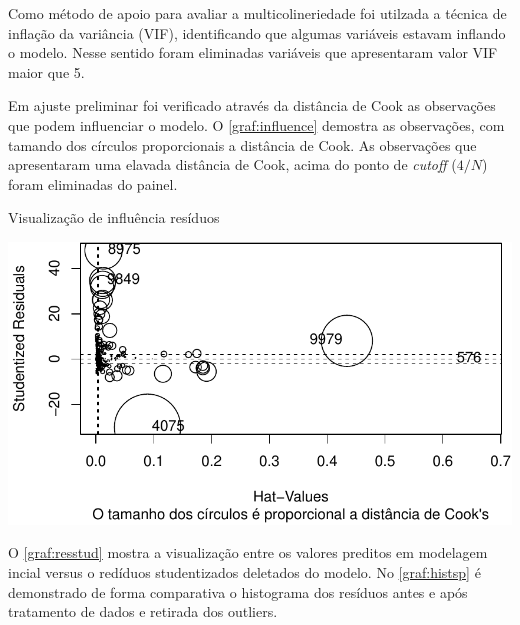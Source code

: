 \documentclass[
  12pt,
  12pt,
  openright,
  oneside,
  a4paper,
  chapter=TITLE,
  section=TITLE,
  subsection=TITLE,
  subsubsection=TITLE,
  english,
  portugues,
  sumario=tradicional]{abntex2}
\begin{document}
Como método de apoio para avaliar a multicolineriedade foi utilzada a técnica de inflação da variância (VIF), identificando que algumas variáveis estavam inflando o modelo. Nesse sentido foram eliminadas variáveis que apresentaram valor VIF maior que 5.

Em ajuste preliminar foi verificado através da distância de Cook as observações que podem influenciar o modelo. O \autoref{graf:influence} demostra as observações, com tamando dos círculos proporcionais a distância de Cook. As observações que apresentaram uma elavada distância de Cook, acima do ponto de \emph{cutoff} (\(4/N\)) foram eliminadas do painel.

\begin{grafico}[!htbp]
\vspace{20pt}
\caption{Visualização de influência resíduos}
\vspace{-4mm}

\begin{center}\includegraphics{12-exportedfigures/influence.plot-1} \end{center}
\vspace{-3mm}
\label{graf:influence}
\vspace{-2mm}
\end{grafico}

O \autoref{graf:resstud} mostra a visualização entre os valores preditos em modelagem incial versus o redíduos studentizados deletados do modelo. No \autoref{graf:histsp} é demonstrado de forma comparativa o histograma dos resíduos antes e após tratamento de dados e retirada dos outliers.
\end{document}
